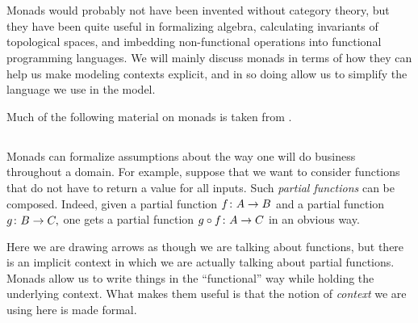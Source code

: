 \documentclass[CT4S-EN-RU]{subfiles}
\begin{document}
\section{}\label{sec:monads}

\begin{blockENG}
Monads would probably not have been invented without category theory, but they have been quite useful in formalizing algebra, calculating invariants of topological spaces, and imbedding non-functional operations into functional programming languages. We will mainly discuss monads in terms of how they can help us make modeling contexts explicit, and in so doing allow us to simplify the language we use in the model.
\end{blockENG}

\begin{blockRUS}
\end{blockRUS}

\begin{blockENG}
Much of the following material on monads is taken from \cite{Sp3}.
\end{blockENG}

\begin{blockRUS}
\end{blockRUS}


\subsection{}

\begin{blockENG}
Monads can formalize assumptions about the way one will do business throughout a domain. For example, suppose that we want to consider functions that do not have to return a value for all inputs. Such {\em partial functions} can be composed. Indeed, given a partial function $f\colon A\rightarrow B$ and a partial function $g\colon B\rightarrow C,$ one gets a partial function $g\circ f\colon A\rightarrow C$ in an obvious way.
\end{blockENG}

\begin{blockRUS}
\end{blockRUS}

\begin{blockENG}
Here we are drawing arrows as though we are talking about functions, but there is an implicit context in which we are actually talking about partial functions. Monads allow us to write things in the “functional” way while holding the underlying context. What makes them useful is that the notion of {\em context} we are using here is made formal.
\end{blockENG}
\end{document}
